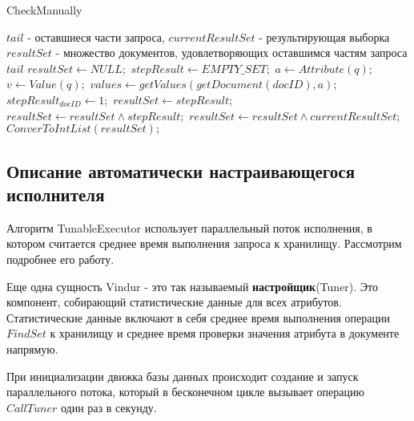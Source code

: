 \documentclass{matmex-diploma}
\begin{document}
        \begin{algorithm}[H]                   
        \caption{CheckManually}              
        \label{check}                        
            \begin{algorithmic}        
                \REQUIRE $tail$ - оставшиеся части запроса, $currentResultSet$ - результирующая выборка
                \ENSURE $resultSet$ - множество документов, удовлетворяющих оставшимся частям запроса $tail$
                \STATE $resultSet \leftarrow NULL;$
                    \STATE $stepResult \leftarrow EMPTY\_SET;$
                        \STATE $a \leftarrow Attribute(q);$
                        \STATE $v \leftarrow Value(q);$
                        \STATE $values \leftarrow getValues(getDocument(docID), a);$
                            \STATE $stepResult_{docID} \leftarrow 1;$
                        \ENDIF
                    \ENDFOR
                        \STATE $resultSet \leftarrow stepResult;$
                    \ENDIF
                    \STATE $resultSet \leftarrow resultSet \land stepResult;$
                \ENDFOR
                \STATE $resultSet \leftarrow resultSet \land currentResultSet;$
                \RETURN $ConverToIntList(resultSet);$
            \end{algorithmic}
        \end{algorithm}
        
    \subsection{Описание автоматически настраивающегося исполнителя}
        Алгоритм TunableExecutor использует параллельный поток исполнения, в котором считается среднее время выполнения запроса к хранилищу. Рассмотрим подробнее его работу.
        
        Еще одна сущность Vindur - это так называемый \textbf{настройщик}(Tuner). Это компонент, собирающий статистические данные для всех атрибутов. Статистические данные включают в себя среднее время выполнения операции $FindSet$  к хранилищу и среднее время проверки значения атрибута в документе напрямую.
        
        При инициализации движка базы данных происходит создание и запуск параллельного потока, который в бесконечном цикле вызывает операцию $CallTuner$ один раз в секунду.
        
\end{document}
